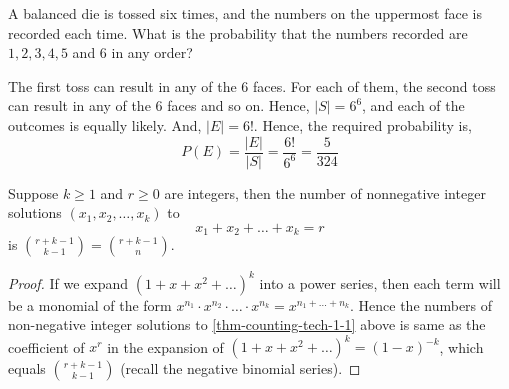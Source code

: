 \begin{example}
    A balanced die is tossed six times, and the numbers on the uppermost face
is recorded each time. What is the probability that the numbers recorded are
$1, 2, 3, 4, 5$ and $6$ in any order?
\end{example}
\begin{solution}
    The first toss can result in any of the $6$ faces. For each of them, the
second toss can result in any of the $6$ faces and so on. Hence, $\vert S
\vert = 6^6$, and each of the outcomes is equally likely. And, $\vert E \vert
= 6!$. Hence, the required probability is, 
\begin{equation*}
    P(E) = \frac{\vert E \vert}{\vert S \vert} 
         = \frac{6!}{6^6} 
         = \frac{5}{324}
\end{equation*}
\end{solution}

\begin{theorem}
    Suppose $k \geq 1$ and $r \geq 0$ are integers, then the number of
nonnegative integer solutions $(x_1, x_2, \dots, x_k)$ to
\begin{equation}
    \label{thm-counting-tech-1-1}
    x_1 + x_2 + \dots + x_k = r
\end{equation}
is ${{r + k - 1} \choose {k - 1}} = {{r + k - 1} \choose {n}}$.
\end{theorem}
\begin{proof}
    If we expand $(1 + x + x^2 + \dots)^k$ into a power series, then each term
will be a monomial of the form $x^{n_1} \cdot x^{n_2} \cdot \dots \cdot
x^{n_k} = x^{n_1 + \dots + n_k}$. Hence the numbers of non-negative integer
solutions to \ref{thm-counting-tech-1-1} above is same as the coefficient of
$x^r$ in the expansion of $(1 + x + x^2 + \dots)^k = (1 - x)^{-k}$, which
equals ${{r + k - 1} \choose {k - 1}}$ (recall the negative binomial series).
\end{proof}

